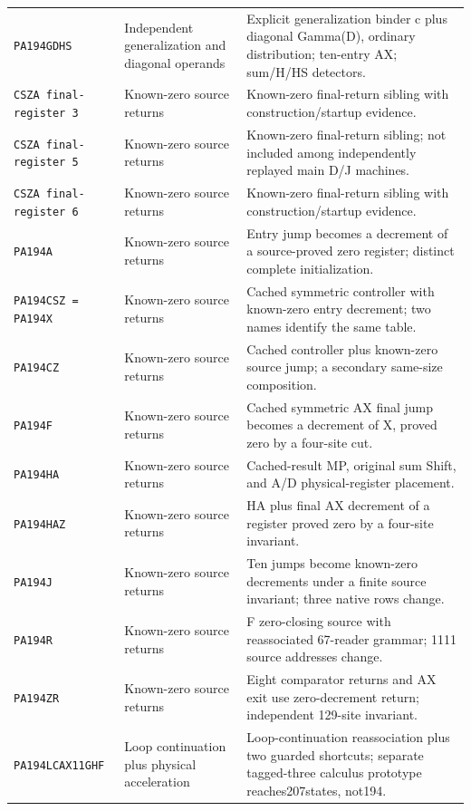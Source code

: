 \begin{longtable}{@{}>{\raggedright\arraybackslash}p{}>{\raggedright\arraybackslash}p{}>{\raggedright\arraybackslash}p{}@{}}
\nolinkurl{PA194GDHS} & Independent generalization and diagonal operands & Explicit generalization binder c plus diagonal Gamma(D), ordinary distribution; ten-entry AX; sum/H/HS detectors.\\
\nolinkurl{CSZA final-register 3} & Known-zero source returns & Known-zero final-return sibling with construction/startup evidence.\\
\nolinkurl{CSZA final-register 5} & Known-zero source returns & Known-zero final-return sibling; not included among independently replayed main D/J machines.\\
\nolinkurl{CSZA final-register 6} & Known-zero source returns & Known-zero final-return sibling with construction/startup evidence.\\
\nolinkurl{PA194A} & Known-zero source returns & Entry jump becomes a decrement of a source-proved zero register; distinct complete initialization.\\
\nolinkurl{PA194CSZ = PA194X} & Known-zero source returns & Cached symmetric controller with known-zero entry decrement; two names identify the same table.\\
\nolinkurl{PA194CZ} & Known-zero source returns & Cached controller plus known-zero source jump; a secondary same-size composition.\\
\nolinkurl{PA194F} & Known-zero source returns & Cached symmetric AX final jump becomes a decrement of X, proved zero by a four-site cut.\\
\nolinkurl{PA194HA} & Known-zero source returns & Cached-result MP, original sum Shift, and A/D physical-register placement.\\
\nolinkurl{PA194HAZ} & Known-zero source returns & HA plus final AX decrement of a register proved zero by a four-site invariant.\\
\nolinkurl{PA194J} & Known-zero source returns & Ten jumps become known-zero decrements under a finite source invariant; three native rows change.\\
\nolinkurl{PA194R} & Known-zero source returns & F zero-closing source with reassociated 67-reader grammar; 1111 source addresses change.\\
\nolinkurl{PA194ZR} & Known-zero source returns & Eight comparator returns and AX exit use zero-decrement return; independent 129-site invariant.\\
\nolinkurl{PA194LCAX11GHF} & Loop continuation plus physical acceleration & Loop-continuation reassociation plus two guarded shortcuts; separate tagged-three calculus prototype reaches207states, not194.\\

\end{longtable}
